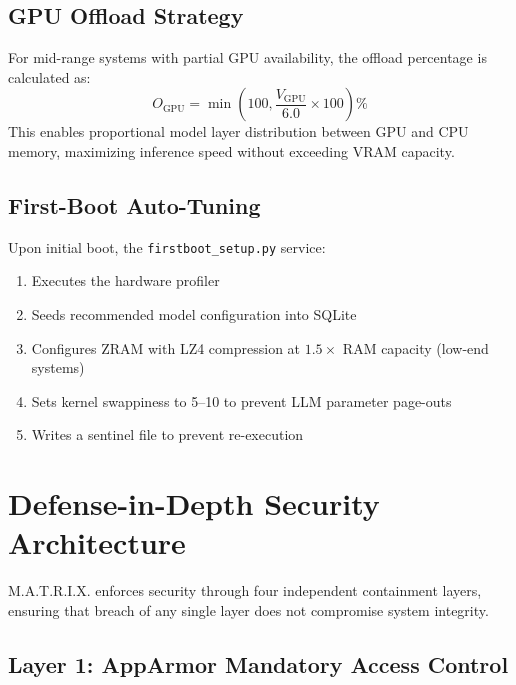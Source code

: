 \documentclass[conference]{IEEEtran}
\begin{document}
\subsection{GPU Offload Strategy}

For mid-range systems with partial GPU availability, the offload percentage is calculated as:
\begin{equation}
O_{\text{GPU}} = \min\left(100, \frac{V_{\text{GPU}}}{6.0} \times 100\right)\%
\end{equation}
This enables proportional model layer distribution between GPU and CPU memory, maximizing inference speed without exceeding VRAM capacity.

\subsection{First-Boot Auto-Tuning}

Upon initial boot, the \texttt{firstboot\_setup.py} service:
\begin{enumerate}
    \item Executes the hardware profiler
    \item Seeds recommended model configuration into SQLite
    \item Configures ZRAM with LZ4 compression at $1.5\times$ RAM capacity (low-end systems)
    \item Sets kernel swappiness to 5--10 to prevent LLM parameter page-outs
    \item Writes a sentinel file to prevent re-execution
\end{enumerate}


\section{Defense-in-Depth Security Architecture}
\label{sec:security}

M.A.T.R.I.X. enforces security through four independent containment layers, ensuring that breach of any single layer does not compromise system integrity.

\subsection{Layer 1: AppArmor Mandatory Access Control}
\end{document}
